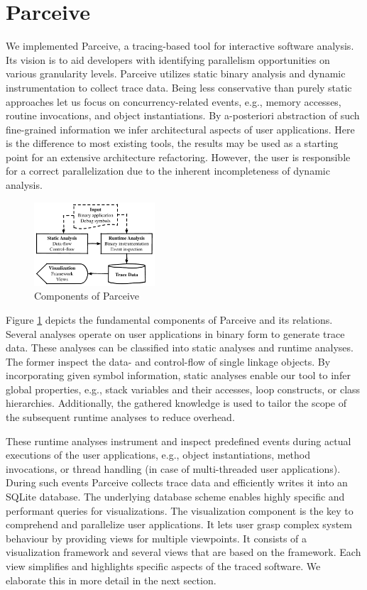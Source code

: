 \section{Parceive}
\label{sec:parceive}
We implemented Parceive, a tracing-based tool for interactive software
analysis. Its vision is to aid developers with identifying parallelism
opportunities on various granularity levels. Parceive utilizes static binary
analysis and dynamic instrumentation to collect trace data. Being less
conservative than purely static approaches let us focus on concurrency-related
events, e.g., memory accesses, routine invocations, and object instantiations.
By a-posteriori abstraction of such fine-grained information we infer
architectural aspects of user applications. Here is the difference to most
existing tools, the results may be used as a starting point for an extensive
architecture refactoring. However, the user is responsible for a correct
parallelization due to the inherent incompleteness of dynamic analysis.

\begin{figure}[h!]
	\begin{center}
		\includegraphics[width=0.40\textwidth]{img/parceive}
		\caption{Components of Parceive}
		\label{fig:parceive_overview}
	\end{center}
\end{figure}

Figure \ref{fig:parceive_overview} depicts the fundamental components of
Parceive and its relations. Several analyses operate on user applications in
binary form to generate trace data. These analyses can be classified into
static analyses and runtime analyses. The former inspect the data- and
control-flow of single linkage objects. By incorporating given symbol
information, static analyses enable our tool to infer global properties, e.g.,
stack variables and their accesses, loop constructs, or class hierarchies.
Additionally, the gathered knowledge is used to tailor the scope of the
subsequent runtime analyses to reduce overhead.

These runtime analyses instrument and inspect predefined events during actual
executions of the user applications, e.g., object instantiations, method
invocations, or thread handling (in case of multi-threaded user applications).
During such events Parceive collects trace data and efficiently writes it into
an SQLite database. The underlying database scheme enables highly specific and
performant queries for visualizations. The visualization component is the key
to comprehend and parallelize user applications. It lets user grasp complex
system behaviour by providing views for multiple viewpoints. It consists of a
visualization framework and several views that are based on the framework. Each
view simplifies and highlights specific aspects of the traced software. We
elaborate this in more detail in the next section.